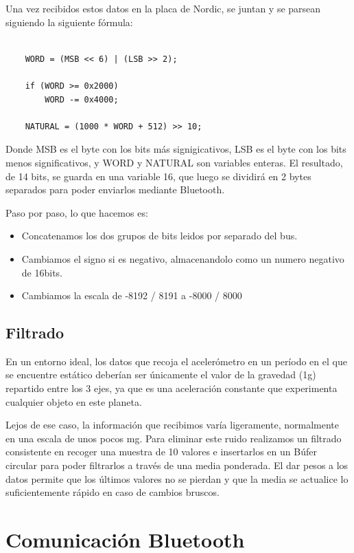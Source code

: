 Una vez recibidos estos datos en la placa de Nordic, se juntan y se parsean siguiendo la siguiente fórmula:

\begin{lstlisting}[frame=single]

	WORD = (MSB << 6) | (LSB >> 2);
	
	if (WORD >= 0x2000)
		WORD -= 0x4000;

	NATURAL = (1000 * WORD + 512) >> 10;

\end{lstlisting}

Donde MSB es el byte con los bits más signigicativos, LSB es el byte con los bits menos significativos, y WORD y NATURAL son variables enteras. El resultado, de 14 bits, se guarda en una variable 16, que luego se dividirá en 2 bytes separados para poder enviarlos mediante Bluetooth.

Paso por paso, lo que hacemos es:

\begin{itemize}
	\item Concatenamos los dos grupos de bits leidos por separado del bus.
	\item Cambiamos el signo si es negativo, almacenandolo como un numero negativo de 16bits.
	\item Cambiamos la escala de -8192 / 8191 a -8000 / 8000
\end{itemize}

\subsection{Filtrado}
\label{makereference5.4.2}

En un entorno ideal, los datos que recoja el acelerómetro en un período en el que se encuentre estático deberían ser únicamente el valor de la gravedad (1g) repartido entre los 3 ejes, ya que es una aceleración constante que experimenta cualquier objeto en este planeta.

Lejos de ese caso, la información que recibimos varía ligeramente, normalmente en una escala de unos pocos mg. Para eliminar este ruido realizamos un filtrado consistente en recoger una muestra de 10 valores e insertarlos en un Búfer circular para poder filtrarlos a través de una media ponderada. El dar pesos a los datos permite que los últimos valores no se pierdan y que la media se actualice lo suficientemente rápido en caso de cambios bruscos.

\section{Comunicación Bluetooth}
\label{makereference5.2}

